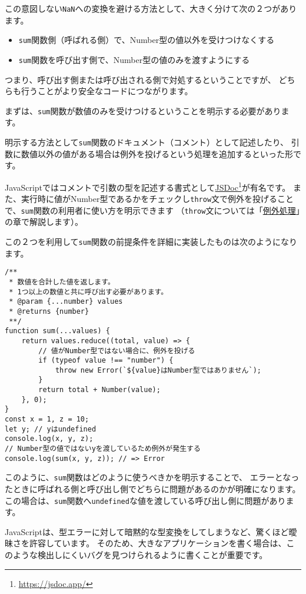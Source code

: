 この意図しない\texttt{NaN}への変換を避ける方法として、大きく分けて次の２つがあります。

\begin{itemize}
\item
  \texttt{sum}関数側（呼ばれる側）で、Number型の値以外を受けつけなくする
\item
  \texttt{sum}関数を呼び出す側で、Number型の値のみを渡すようにする
\end{itemize}

つまり、呼び出す側または呼び出される側で対処するということですが、
どちらも行うことがより安全なコードにつながります。

まずは、\texttt{sum}関数が数値のみを受けつけるということを明示する必要があります。

明示する方法として\texttt{sum}関数のドキュメント（コメント）として記述したり、
引数に数値以外の値がある場合は例外を投げるという処理を追加するといった形です。

JavaScriptではコメントで引数の型を記述する書式として\href{https://jsdoc.app/}{JSDoc}\footnote{\url{https://jsdoc.app/}}が有名です。
また、実行時に値がNumber型であるかをチェックし\texttt{throw}文で例外を投げることで、\texttt{sum}関数の利用者に使い方を明示できます
（\texttt{throw}文については「\hyperlink{error-handling}{例外処理}」の章で解説します）。

この２つを利用して\texttt{sum}関数の前提条件を詳細に実装したものは次のようになります。

\enlargethispage{\baselineskip}\begin{lstlisting}
/**
 * 数値を合計した値を返します。
 * 1つ以上の数値と共に呼び出す必要があります。
 * @param {...number} values
 * @returns {number}
 **/
function sum(...values) {
    return values.reduce((total, value) => {
        // 値がNumber型ではない場合に、例外を投げる
        if (typeof value !== "number") {
            throw new Error(`${value}はNumber型ではありません`);
        }
        return total + Number(value);
    }, 0);
}
const x = 1, z = 10;
let y; // yはundefined
console.log(x, y, z);
// Number型の値ではないyを渡しているため例外が発生する
console.log(sum(x, y, z)); // => Error
\end{lstlisting}

このように、\texttt{sum}関数はどのように使うべきかを明示することで、
エラーとなったときに呼ばれる側と呼び出し側でどちらに問題があるのかが明確になります。
この場合は、\texttt{sum}関数へ\texttt{undefined}な値を渡している呼び出し側に問題があります。

JavaScriptは、型エラーに対して暗黙的な型変換をしてしまうなど、驚くほど曖昧さを許容しています。
そのため、大きなアプリケーションを書く場合は、このような検出しにくいバグを見つけられるように書くことが重要です。

